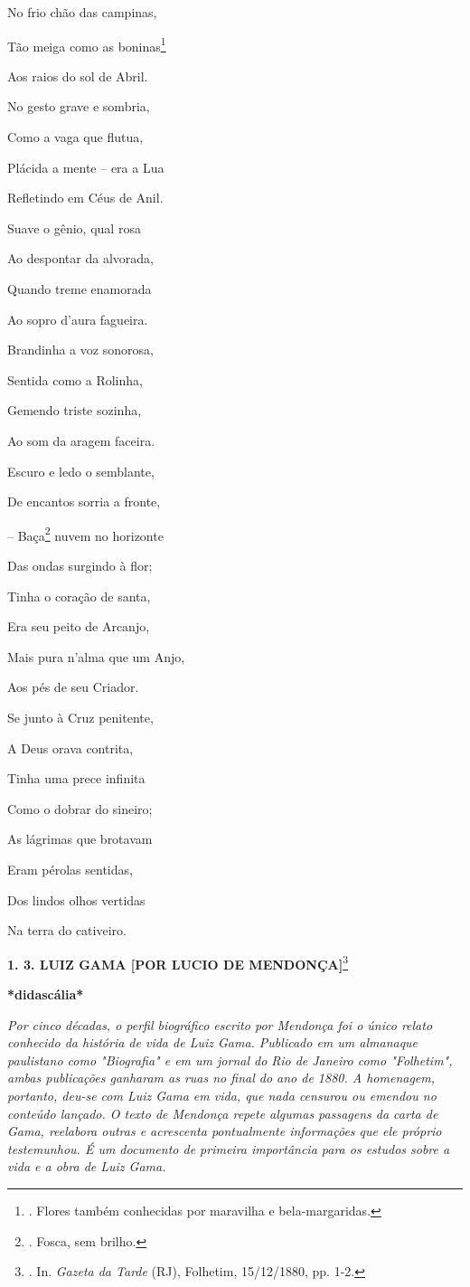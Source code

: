 No frio chão das campinas,

Tão meiga como as boninas\footnote{. Flores também conhecidas por
  maravilha e bela-margaridas.}

Aos raios do sol de Abril.

No gesto grave e sombria,

Como a vaga que flutua,

Plácida a mente -- era a Lua

Refletindo em Céus de Anil.

Suave o gênio, qual rosa

Ao despontar da alvorada,

Quando treme enamorada

Ao sopro d'aura fagueira.

Brandinha a voz sonorosa,

Sentida como a Rolinha,

Gemendo triste sozinha,

Ao som da aragem faceira.

Escuro e ledo o semblante,

De encantos sorria a fronte,

-- Baça\footnote{. Fosca, sem brilho.}
nuvem no horizonte

Das ondas surgindo à flor;

Tinha o coração de santa,

Era seu peito de Arcanjo,

Mais pura n'alma que um Anjo,

Aos pés de seu Criador.

Se junto à Cruz penitente,

A Deus orava contrita,

Tinha uma prece infinita

Como o dobrar do sineiro;

As lágrimas que brotavam

Eram pérolas sentidas,

Dos lindos olhos vertidas

Na terra do cativeiro.

\textbf{1. 3. LUIZ GAMA {[}POR LUCIO DE MENDONÇA{]}}\footnote{. In.
  \emph{Gazeta da Tarde} (RJ), Folhetim, 15/12/1880, pp. 1-2.}

\textbf{*didascália*}

\emph{Por cinco décadas, o perfil biográfico escrito por Mendonça foi o
único relato conhecido da história de vida de Luiz Gama. Publicado em um
almanaque paulistano como "Biografia" e em um jornal do Rio de Janeiro
como "Folhetim", ambas publicações ganharam as ruas no final do ano de
1880. A homenagem, portanto, deu-se com Luiz Gama em vida, que nada
censurou ou emendou no conteúdo lançado. O texto de Mendonça repete
algumas passagens da carta de Gama, reelabora outras e acrescenta
pontualmente informações que ele próprio testemunhou. É um documento de
primeira importância para os estudos sobre a vida e a obra de Luiz Gama.
}

